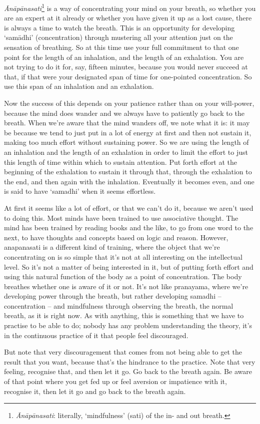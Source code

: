 
\textit{\=An\=ap\=anasati}\footnote{\textit{\=An\=ap\=anasati}: literally, `mindfulness' (sati) of the in- and out breath.} is a way of concentrating your mind on your breath, so whether you are an expert at it already or whether you have given it up as a lost cause, there is always a time to watch the breath. This is an opportunity for developing `sam\=adhi' (concentration) through mustering all your attention just on the sensation of breathing. So at this time use your full commitment to that one point for the length of an inhalation, and the length of an exhalation. You are not trying to do it for, say, fifteen minutes, because you would never succeed at that, if that were your designated span of time for one-pointed concentration. So use this span of an inhalation and an exhalation.

Now the success of this depends on your patience rather than on your will-power, because the mind does wander and we always have to patiently go back to the breath. When we're aware that the mind wanders off, we note what it is: it may be because we tend to just put in a lot of energy at first and then not sustain it, making too much effort without sustaining power. So we are using the length of an inhalation and the length of an exhalation in order to limit the effort to just this length of time within which to sustain attention. Put forth effort at the beginning of the exhalation to sustain it through that, through the exhalation to the end, and then again with the inhalation. Eventually it becomes even, and one is said to have `samadhi' when it seems effortless.

At first it seems like a lot of effort, or that we can't do it, because we aren't used to doing this. Most minds have been trained to use associative thought. The mind has been trained by reading books and the like, to go from one word to the next, to have thoughts and concepts based on logic and reason. However, anapanasati is a different kind of training, where the object that we're concentrating on is so simple that it's not at all interesting on the intellectual level. So it's not a matter of being interested in it, but of putting forth effort and using this natural function of the body as a point of concentration. The body breathes whether one is aware of it or not. It's not like pranayama, where we're developing power through the breath, but rather developing samadhi -- concentration -- and mindfulness through observing the breath, the normal breath, as it is right now. As with anything, this is something that we have to practise to be able to do; nobody has any problem understanding the theory, it's in the continuous practice of it that people feel discouraged.

But note that very discouragement that comes from not being able to get the result that you want, because that's the hindrance to the practice. Note that very feeling, recognise that, and then let it go. Go back to the breath again. Be aware of that point where you get fed up or feel aversion or impatience with it, recognise it, then let it go and go back to the breath again.
